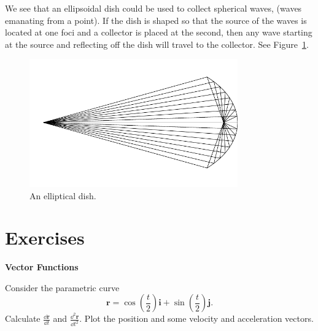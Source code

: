 \begin{Example}
  We see that an ellipsoidal dish could be used to collect spherical waves, 
  (waves emanating from a point).  If the dish is shaped so that the source
  of the waves is located at one foci and a collector is placed at the second,
  then any wave starting at the source and reflecting off the dish will travel
  to the collector.  See Figure~\ref{ellipse_dish}.
  \begin{figure}[h!]
    \begin{center}
      \includegraphics[width=0.8\textwidth]{calculus/vector/ellipse_dish}
    \end{center}
    \caption{An elliptical dish.}
    \label{ellipse_dish}
  \end{figure}
\end{Example}







\raggedbottom
\pagebreak
\flushbottom
\section{Exercises}



\begin{large}
  \noindent
  \textbf{Vector Functions}
\end{large}




\begin{Exercise}
  \label{exercise parametric cos t/2 + sin t/2}
  Consider the parametric curve 
  \[
  \mathbf{r} = \cos \left( \frac{t}{2} \right) \mathbf{i} 
  + \sin \left( \frac{t}{2} \right) \mathbf{j}.
  \]
  Calculate $\frac{\dd \mathbf{r}}{\dd t}$ and
  $\frac{\dd^2 \mathbf{r}}{\dd t^2}$.  Plot the position and some velocity and
  acceleration vectors.

\end{Exercise}





